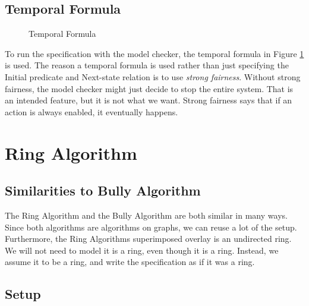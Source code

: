 \documentclass{report}
\begin{document}
\section{Temporal Formula}

\begin{figure}
\tlatex

\@x{}\moduleLeftDash{}\moduleRightDash\@xx{}%


\@x{}\bottombar\@xx{}%

\caption{Temporal Formula}
\label{bullyspec}
\end{figure}


To run the specification with the model checker, the temporal formula in Figure \ref{bullyspec} is used. The reason a temporal formula is used rather than just specifying the Initial predicate and Next-state relation is to use \textit{strong fairness}. Without strong fairness, the model checker might just decide to stop the entire system. That is an intended feature, but it is not what we want. Strong fairness says that if an action is always enabled, it eventually happens.


\chapter{Ring Algorithm}


\section{Similarities to Bully Algorithm}
The Ring Algorithm and the Bully Algorithm are both similar in many ways. Since both algorithms are algorithms on graphs, we can reuse a lot of the setup. Furthermore, the Ring Algorithms superimposed overlay is an undirected ring. We will not need to model it is a ring, even though it is a ring. Instead, we assume it to be a ring, and write the specification as if it was a ring.


\section{Setup}
\end{document}
